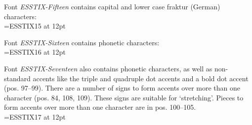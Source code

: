 \documentclass[11pt]{amsart}
\begin{document}
Font  \emph{ESSTIX-Fifteen} contains capital and lower case fraktur (German) characters:\\[3pt]\font\ess=ESSTIX15 at 12pt
{\ess{}}\newline
{\ess{}}

Font  \emph{ESSTIX-Sixteen} contains phonetic characters:\\[3pt]\font\ess=ESSTIX16 at 12pt
{\ess{}}\newline
{\ess{}}\newline
{\ess{}}\newline
{\ess{}}

Font  \emph{ESSTIX-Seventeen}  also contains phonetic characters, as well as non-standard accents like the triple and quadruple dot accents and a bold dot accent (pos. 97--99). There are a number of signs to form accents over more than one character (pos. 84, 108, 109). These signs are suitable for `stretching'. Pieces to form accents over more than one character are in pos. 100--105.\\[3pt]\font\ess=ESSTIX17 at 12pt
{\ess{}}\newline
{\ess{}}\newline
{\ess{}}\newline
{\ess{}}
\end{document}
